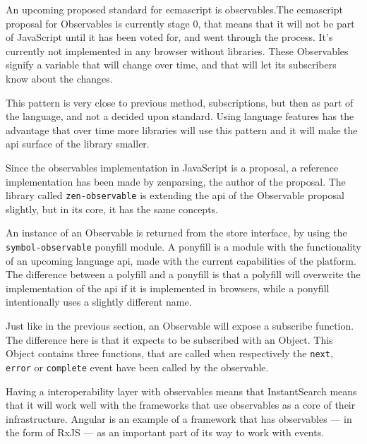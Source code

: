 An upcoming proposed standard for \acrshort{ecmascript} is observables.The \acrshort{ecmascript} proposal for Observables is currently stage 0\cite{tc39-observable}, that means that it will not be part of JavaScript until it has been voted for, and went through the process. It's currently not implemented in any browser without libraries. These Observables signify a variable that will change over time, and that will let its subscribers know about the changes.

This pattern is very close to previous method, subscriptions, but then as part of the language, and not a decided upon standard. Using language features has the advantage that over time more libraries will use this pattern and it will make the \acrshort{api} surface of the \gls{library} smaller.

Since the observables implementation in JavaScript is a proposal, a reference implementation has been made by zenparsing, the author of the proposal. The \gls{library} called {\tt zen-observable}\cite{zenparsing-observable} is extending the \acrshort{api} of the Observable proposal slightly, but in its core, it has the same concepts.

An instance of an Observable is returned from the store interface, by using the {\tt symbol-observable}\cite{symbol-observable} ponyfill module. A ponyfill\cite{ponyfill} is a module with the functionality of an upcoming language \acrshort{api}, made with the current capabilities of the platform. The difference between a polyfill and a ponyfill is that a polyfill will overwrite the implementation of the \acrshort{api} if it is implemented in browsers, while a ponyfill intentionally uses a slightly different name.

Just like in the previous section, an Observable will expose a subscribe function. The difference here is that it expects to be subscribed with an Object. This Object contains three functions, that are called when respectively the {\tt next}, {\tt error} or {\tt complete} event have been called by the observable.

Having a interoperability layer with observables means that InstantSearch means that it will work well with the frameworks that use observables as a core of their infrastructure. Angular is an example of a framework that has observables --- in the form of RxJS\cite{angular-rx} --- as an important part of its way to work with events.

